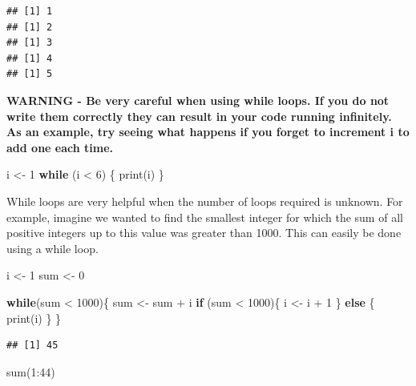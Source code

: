 \documentclass[
]{book}
\newenvironment{Shaded}{\begin{snugshade}}{\end{snugshade}}
\newcommand{\ControlFlowTok}[1]{\textcolor[rgb]{0.13,0.29,0.53}{\textbf{#1}}}
\newcommand{\DecValTok}[1]{\textcolor[rgb]{0.00,0.00,0.81}{#1}}
\newcommand{\FunctionTok}[1]{\textcolor[rgb]{0.00,0.00,0.00}{#1}}
\newcommand{\NormalTok}[1]{#1}
\newcommand{\OtherTok}[1]{\textcolor[rgb]{0.56,0.35,0.01}{#1}}
\newcommand{\SpecialCharTok}[1]{\textcolor[rgb]{0.00,0.00,0.00}{#1}}
\theoremstyle{definition}
\theoremstyle{definition}
\theoremstyle{definition}
\theoremstyle{definition}
\theoremstyle{remark}
\begin{document}
\begin{verbatim}
## [1] 1
## [1] 2
## [1] 3
## [1] 4
## [1] 5
\end{verbatim}

\textbf{WARNING - Be very careful when using while loops. If you do not write them correctly they can result in your code running infinitely. As an example, try seeing what happens if you forget to increment i to add one each time.}

\begin{Shaded}
\begin{Highlighting}[]
\NormalTok{i }\OtherTok{\textless{}{-}} \DecValTok{1}
\ControlFlowTok{while}\NormalTok{ (i }\SpecialCharTok{\textless{}} \DecValTok{6}\NormalTok{) \{}
  \FunctionTok{print}\NormalTok{(i)}
\NormalTok{\}}
\end{Highlighting}
\end{Shaded}

While loops are very helpful when the number of loops required is unknown. For example, imagine we wanted to find the smallest integer for which the sum of all positive integers up to this value was greater than 1000. This can easily be done using a while loop.

\begin{Shaded}
\begin{Highlighting}[]
\NormalTok{i }\OtherTok{\textless{}{-}} \DecValTok{1}
\NormalTok{sum }\OtherTok{\textless{}{-}} \DecValTok{0}

\ControlFlowTok{while}\NormalTok{(sum }\SpecialCharTok{\textless{}} \DecValTok{1000}\NormalTok{)\{}
\NormalTok{  sum }\OtherTok{\textless{}{-}}\NormalTok{ sum }\SpecialCharTok{+}\NormalTok{ i}
  \ControlFlowTok{if}\NormalTok{ (sum }\SpecialCharTok{\textless{}} \DecValTok{1000}\NormalTok{)\{}
\NormalTok{  i }\OtherTok{\textless{}{-}}\NormalTok{ i }\SpecialCharTok{+} \DecValTok{1}
\NormalTok{  \} }\ControlFlowTok{else}\NormalTok{ \{}
    \FunctionTok{print}\NormalTok{(i)}
\NormalTok{  \}}
\NormalTok{\}}
\end{Highlighting}
\end{Shaded}

\begin{verbatim}
## [1] 45
\end{verbatim}

\begin{Shaded}
\begin{Highlighting}[]
\FunctionTok{sum}\NormalTok{(}\DecValTok{1}\SpecialCharTok{:}\DecValTok{44}\NormalTok{)}
\end{Highlighting}
\end{Shaded}
\end{document}
